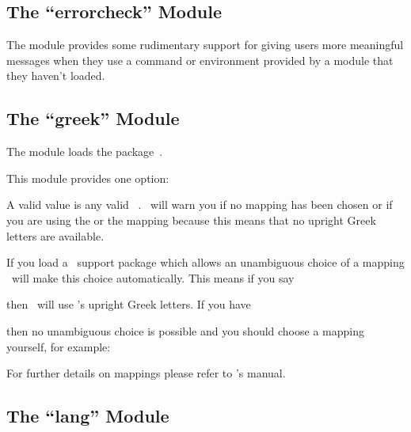 \documentclass{chemmacros-manual}
\def\chemmodule*#1{\textquotedblleft#1\textquotedblright}%
\begin{document}
\subsection{The \chemmodule*{errorcheck} Module}\label{sec:errorcheck-module}
The  module provides some rudimentary
support for giving users more meaningful messages when they use a command or
environment provided by a module that they haven't loaded.

\subsection{The \chemmodule*{greek} Module}\label{sec:greek-module}

The  module loads the 
package~\cite{pkg:chemgreek}.

This module provides one option:
\begin{options}
    A valid value is any valid \chemgreek\ .  \chemmacros\ will
    warn you if no mapping has been chosen or if you are using the
     or the  mapping because this means that
    no upright Greek letters are available.
\end{options}
If you load a \chemgreek\ support package which allows an unambiguous choice
of a mapping \chemgreek\ will make this choice automatically.  This means if
you say
\begin{sourcecode}
  \usepackage{upgreek}
  \usepackage{chemmacros}
\end{sourcecode}
then \chemmacros\ will use 's upright Greek letters.  If you
have
\begin{sourcecode}
  \usepackage{upgreek}
  \usepackage{chemmacros}
  \usepackage{textgreek}
\end{sourcecode}
then no unambiguous choice is possible and you should choose a mapping
yourself, for example:
\begin{sourcecode}
  \usepackage{upgreek}
  \usepackage{chemmacros}
  \usepackage{textgreek}
\end{sourcecode}
For further details on mappings please refer to \chemgreek's manual.

\subsection{The \chemmodule*{lang} Module}\label{sec:lang-module}
\end{document}
